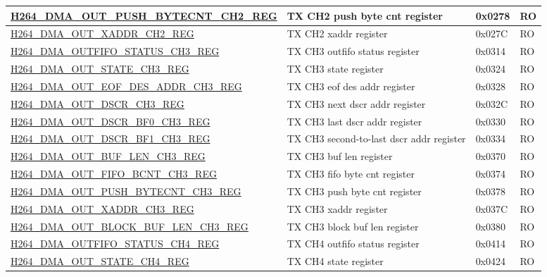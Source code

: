 \begin{longtable}{ | p{7.5cm} | p{5.7cm} | p{1.2cm} | p{1cm} | }
    \hyperref[regdesc:H264DMAOUTPUSHBYTECNTCH2REG]{H264\_DMA\_OUT\_PUSH\_BYTECNT\_CH2\_REG} & TX CH2 push byte cnt register & 0x0278 & RO \\ \hline
    \hyperref[regdesc:H264DMAOUTXADDRCH2REG]{H264\_DMA\_OUT\_XADDR\_CH2\_REG} & TX CH2 xaddr register & 0x027C & RO \\ \hline
    \hyperref[regdesc:H264DMAOUTFIFOSTATUSCH3REG]{H264\_DMA\_OUTFIFO\_STATUS\_CH3\_REG} & TX CH3 outfifo status register & 0x0314 & RO \\ \hline
    \hyperref[regdesc:H264DMAOUTSTATECH3REG]{H264\_DMA\_OUT\_STATE\_CH3\_REG} & TX CH3 state register & 0x0324 & RO \\ \hline
    \hyperref[regdesc:H264DMAOUTEOFDESADDRCH3REG]{H264\_DMA\_OUT\_EOF\_DES\_ADDR\_CH3\_REG} & TX CH3 eof des addr register & 0x0328 & RO \\ \hline
    \hyperref[regdesc:H264DMAOUTDSCRCH3REG]{H264\_DMA\_OUT\_DSCR\_CH3\_REG} & TX CH3 next dscr addr register & 0x032C & RO \\ \hline
    \hyperref[regdesc:H264DMAOUTDSCRBF0CH3REG]{H264\_DMA\_OUT\_DSCR\_BF0\_CH3\_REG} & TX CH3 last dscr addr register & 0x0330 & RO \\ \hline
    \hyperref[regdesc:H264DMAOUTDSCRBF1CH3REG]{H264\_DMA\_OUT\_DSCR\_BF1\_CH3\_REG} & TX CH3 second-to-last dscr addr register & 0x0334 & RO \\ \hline
    \hyperref[regdesc:H264DMAOUTBUFLENCH3REG]{H264\_DMA\_OUT\_BUF\_LEN\_CH3\_REG} & TX CH3 buf len register & 0x0370 & RO \\ \hline
    \hyperref[regdesc:H264DMAOUTFIFOBCNTCH3REG]{H264\_DMA\_OUT\_FIFO\_BCNT\_CH3\_REG} & TX CH3 fifo byte cnt register & 0x0374 & RO \\ \hline
    \hyperref[regdesc:H264DMAOUTPUSHBYTECNTCH3REG]{H264\_DMA\_OUT\_PUSH\_BYTECNT\_CH3\_REG} & TX CH3 push byte cnt register & 0x0378 & RO \\ \hline
    \hyperref[regdesc:H264DMAOUTXADDRCH3REG]{H264\_DMA\_OUT\_XADDR\_CH3\_REG} & TX CH3 xaddr register & 0x037C & RO \\ \hline
    \hyperref[regdesc:H264DMAOUTBLOCKBUFLENCH3REG]{H264\_DMA\_OUT\_BLOCK\_BUF\_LEN\_CH3\_REG} & TX CH3 block buf len register & 0x0380 & RO \\ \hline
    \hyperref[regdesc:H264DMAOUTFIFOSTATUSCH4REG]{H264\_DMA\_OUTFIFO\_STATUS\_CH4\_REG} & TX CH4 outfifo status register & 0x0414 & RO \\ \hline
    \hyperref[regdesc:H264DMAOUTSTATECH4REG]{H264\_DMA\_OUT\_STATE\_CH4\_REG} & TX CH4 state register & 0x0424 & RO \\ \hline

\end{longtable}
